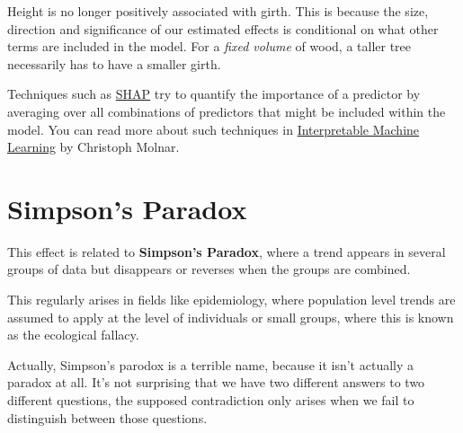 \documentclass[
  12pt,
]{book}
\begin{document}
Height is no longer positively associated with girth. This is because the size, direction and significance of our estimated effects is conditional on what other terms are included in the model. For a \emph{fixed volume} of wood, a taller tree necessarily has to have a smaller girth.

Techniques such as \href{https://christophm.github.io/interpretable-ml-book/shap.html}{SHAP} try to quantify the importance of a predictor by averaging over all combinations of predictors that might be included within the model. You can read more about such techniques in \href{https://christophm.github.io/interpretable-ml-book/}{Interpretable Machine Learning} by Christoph Molnar.

\hypertarget{simpsons-paradox}{%
\section{Simpson's Paradox}\label{simpsons-paradox}}

This effect is related to \textbf{Simpson's Paradox}, where a trend appears in several groups of data but disappears or reverses when the groups are combined.

This regularly arises in fields like epidemiology, where population level trends are assumed to apply at the level of individuals or small groups, where this is known as the ecological fallacy.

Actually, Simpson's parodox is a terrible name, because it isn't actually a paradox at all. It's not surprising that we have two different answers to two different questions, the supposed contradiction only arises when we fail to distinguish between those questions.
\end{document}
